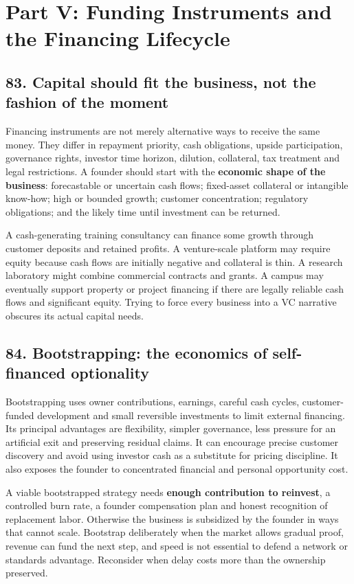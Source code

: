 \section{Part V: Funding Instruments and the Financing Lifecycle}

\subsection{83. Capital should fit the business, not the fashion of the moment}


Financing instruments are not merely alternative ways to receive the same money. They differ in repayment priority, cash obligations, upside participation, governance rights, investor time horizon, dilution, collateral, tax treatment and legal restrictions. A founder should start with the \textbf{economic shape of the business}: forecastable or uncertain cash flows; fixed-asset collateral or intangible know-how; high or bounded growth; customer concentration; regulatory obligations; and the likely time until investment can be returned.

A cash-generating training consultancy can finance some growth through customer deposits and retained profits. A venture-scale platform may require equity because cash flows are initially negative and collateral is thin. A research laboratory might combine commercial contracts and grants. A campus may eventually support property or project financing if there are legally reliable cash flows and significant equity. Trying to force every business into a VC narrative obscures its actual capital needs.

\subsection{84. Bootstrapping: the economics of self-financed optionality}


Bootstrapping uses owner contributions, earnings, careful cash cycles, customer-funded development and small reversible investments to limit external financing. Its principal advantages are flexibility, simpler governance, less pressure for an artificial exit and preserving residual claims. It can encourage precise customer discovery and avoid using investor cash as a substitute for pricing discipline. It also exposes the founder to concentrated financial and personal opportunity cost.

A viable bootstrapped strategy needs \textbf{enough contribution to reinvest}, a controlled burn rate, a founder compensation plan and honest recognition of replacement labor. Otherwise the business is subsidized by the founder in ways that cannot scale. Bootstrap deliberately when the market allows gradual proof, revenue can fund the next step, and speed is not essential to defend a network or standards advantage. Reconsider when delay costs more than the ownership preserved.

